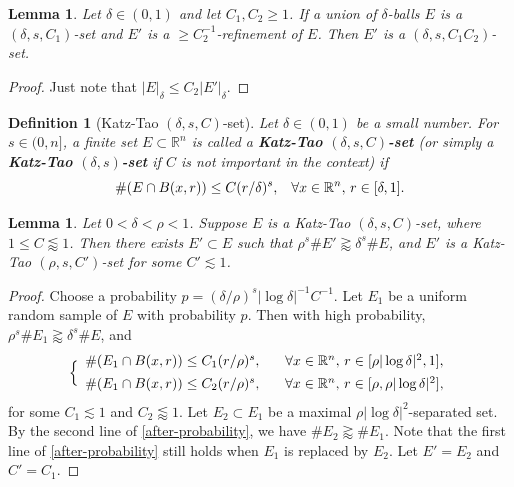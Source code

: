 \documentclass{amsart}
\numberwithin{equation}{section}
\newtheorem{lemma}[theorem]{Lemma}
\newtheorem{definition}[theorem]{Definition}
\newcommand{\de}{\delta}
\newcommand{\ZR}{\mathbb{R}}
\begin{document}
\begin{lemma}
\label{refinement-delta-s-set}
Let $\delta\in(0,1)$ and let $C_1, C_2\geq1$.
If a union of $\de$-balls $E$ is a $(\de,s, C_1)$-set and $E'$ is a $\geq C_2^{-1}$-refinement of $E$. Then $E'$ is a $(\de,s, C_1C_2)$-set. 
\end{lemma}
\begin{proof}
Just note that $|E|_\de\leq C_2|E'|_\de$.
\end{proof}

\begin{definition}[Katz-Tao $(\de,s,C)$-set]
Let $\delta\in(0,1)$ be a small number.
For $s\in(0,n]$, a finite set $E\subset \ZR^n$ is called a {\bf Katz-Tao $(\de,s,C)$-set} (or simply a {\bf Katz-Tao $(\de,s)$-set} if $C$ is not important in the context) if 
\begin{equation}
    \#(E\cap B(x,r))\leq C(r/\de)^s, \hspace{.3cm}\forall x \in\ZR^n, \,r\in[\de,1].
\end{equation}
\end{definition}

\begin{lemma}
\label{katz-tao-set-lem}
Let $0<\de<\rho<1$. 
Suppose $E$ is a Katz-Tao $(\de,s,C)$-set, where $1\leq C\lessapprox1$.
Then there exists $E'\subset E$ such that $\rho^s\#E'\gtrapprox\de^s\#E$, and $E'$ is a Katz-Tao  $(\rho,s,C')$-set for some $C'\lesssim1$.
\end{lemma}
\begin{proof}
Choose a probability $p=(\de/\rho)^s|\log\de|^{-1}C^{-1}$.
Let $E_1$ be a uniform random sample of $E$ with probability $p$.
Then with high probability, $\rho^s\#E_1\gtrapprox\de^s\#E$, and
\begin{equation}
\label{after-probability}
\Big\{
\begin{array}{cc}
    \#(E_1\cap B(x,r))\leq C_1(r/\rho)^s, & \hspace{.3cm}\forall x \in\ZR^n, \,r\in[\rho|\log\de|^2,1], \\[1ex]
    \#(E_1\cap B(x,r))\leq C_2(r/\rho)^s, & \hspace{.3cm}\forall x \in\ZR^n, \,r\in[\rho, \rho|\log\de|^2], 
\end{array}
\end{equation}
for some $C_1\lesssim1$ and $C_2\lessapprox1$.
Let $E_2\subset E_1$ be a maximal $\rho|\log\de|^2$-separated set.
By the second line of \eqref{after-probability}, we have $\#E_2\gtrapprox\# E_1$.
Note that the first line of \eqref{after-probability} still holds when $E_1$ is replaced by $E_2$.
Let $E'=E_2$ and $C'=C_1$. \qedhere

\end{proof}
\end{document}
